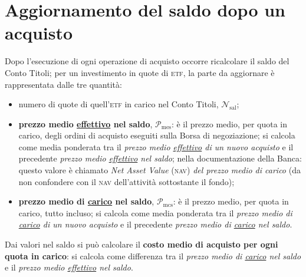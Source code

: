 \documentclass[12pt,a4paper]{article}
\newcommand{\Nav}[0]{\textsc{nav}}
\newcommand{\Etf}[1]{\textsc{etf}}
\newcommand{\Nsal}[1]{\mathcal{N}_{\textrm{sal}#1}}
\newcommand{\Pme}[1]{\mathcal{P}_{\mathrm{me}#1}}
\newcommand{\Pmes}[1]{\Pme{\mathrm{s}#1}}
\newcommand{\Pmc}[1]{\mathcal{P}_{\mathrm{mc}#1}}
\newcommand{\Pmcs}[1]{\Pmc{\mathrm{s}#1}}
\begin{document}
\section{Aggiornamento del saldo dopo un acquisto}




Dopo l'esecuzione di ogni operazione di acquisto  occorre ricalcolare il saldo del Conto Titoli; per
un investimento in quote di \Etf{}, la parte da aggiornare è rappresentata dalle tre quantità:
\begin{itemize}
\item numero di quote di quell'\Etf{} in carico nel Conto Titoli, \(\Nsal{}\);
\item \textbf{prezzo  medio \underline{effettivo} nel  saldo}, \(\Pmes{}\):  è il prezzo  medio, per
  quota in carico,  degli ordini di acquisto  eseguiti sulla Borsa di negoziazione;  si calcola come
  media  ponderata tra  il  \emph{prezzo medio  \underline{effettivo}  di un  nuovo  acquisto} e  il
  precedente \emph{prezzo medio \underline{effettivo} nel  saldo}; nella documentazione della Banca:
  questo valore è chiamato \emph{Net Asset Value} (\Nav{}) \emph{del prezzo medio di carico} (da non
  confondere con il \Nav{} dell'attività sottostante il fondo);
\item \textbf{prezzo  medio di \underline{carico}  nel saldo}, \(\Pmcs{}\):  è il prezzo  medio, per
  quota in  carico, tutto  incluso; si  calcola come media  ponderata tra  il \emph{prezzo  medio di
     \underline{carico}   di  un   nuovo   acquisto}   e  il   precedente   \emph{prezzo  medio   di
     \underline{carico} nel saldo}.
\end{itemize}

Dai valori nel saldo si può calcolare il  \textbf{costo medio di acquisto per ogni quota in carico}:
si  calcola  come differenza  tra  il  \emph{prezzo medio  di  \underline{carico}  nel saldo}  e  il
\emph{prezzo medio \underline{effettivo} nel saldo}.
\end{document}
